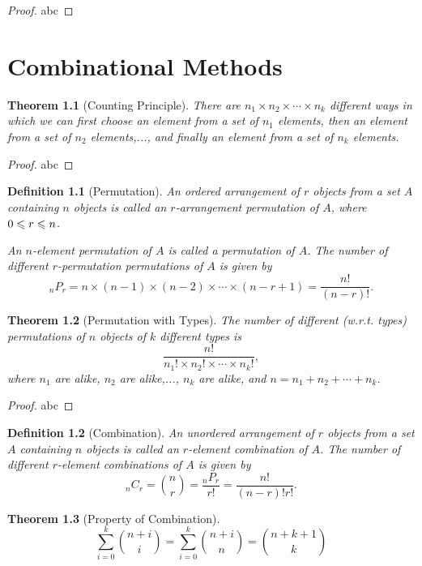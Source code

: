 \documentclass[openany,12pt]{book}
\newtheorem{theorem}{Theorem}[chapter]
\newtheorem{definition}{Definition}[chapter]
\begin{document}
\begin{proof}
  abc
\end{proof}

\chapter{Combinational Methods}

\begin{theorem}[Counting Principle]
  There are $n_1\times n_2\times\cdots\times n_k$ different ways in which we can first choose an element from a set of $n_1$  elements, then an element from a set of $n_2$ elements,..., and finally an element from a set of $n_k$ elements.
\end{theorem}

\begin{proof}
  abc
\end{proof}

\begin{definition}[Permutation]
  An ordered arrangement of $r$ objects from a set $A$ containing $n$ objects is called an $r$-arrangement permutation of $A$, where $0\leqslant r\leqslant n$.

  An $n$-element permutation of $A$ is called a permutation of $A$. The number of different $r$-permutation permutations of $A$ is given by $$_nP_r =n\times(n-1)\times(n-2)\times\cdots\times(n-r+1)=\frac{n!}{(n-r)!}.$$
\end{definition}

\begin{theorem}[Permutation with Types]
  The number of different (w.r.t. types) permutations of $n$ objects of $k$ different types is $$\frac{n!}{n_1 !\times n_2 !\times\cdots\times n_k !},$$
  where $n_1$  are alike, $n_2$  are alike,..., $n_k$  are alike, and $n=n_1+n_2+\cdots+n_k $.
\end{theorem}

\begin{proof}
  abc
\end{proof}

\begin{definition}[Combination]
  An unordered arrangement of $r$ objects from a set $A$ containing $n$ objects is called an $r$-element combination of $A$. The number of different $r$-element combinations of $A$ is given by
  $$_n C_r =\binom n r=\frac{_n P_r}{r!}=\frac{n!}{(n-r)!r!}.$$
\end{definition}

\begin{theorem}[Property of Combination]
  $$\sum_{i=0}^k\binom {n+i} i=\sum_{i=0}^k \binom {n+i} n
    =\binom {n+k+1} k$$
\end{theorem}
\end{document}
